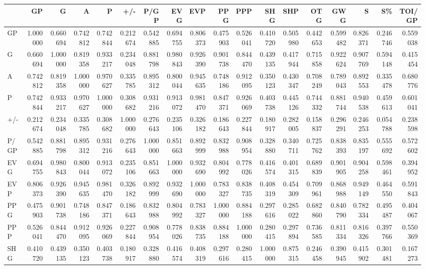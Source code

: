 \begin{tabular}{lrrrrrrrrrrrrrrrrr}
\toprule
 & GP & G & A & P & +/- & P/GP & EVG & EVP & PPG & PPP & SHG & SHP & OTG & GWG & S & S\% & TOI/GP \\
\midrule
GP & 1.000000 & 0.660694 & 0.742812 & 0.742844 & 0.212674 & 0.542885 & 0.694755 & 0.806373 & 0.475903 & 0.526041 & 0.410720 & 0.505980 & 0.442653 & 0.599482 & 0.826371 & 0.246746 & 0.559038 \\
G & 0.660694 & 1.000000 & 0.819358 & 0.933217 & 0.234048 & 0.881798 & 0.980843 & 0.926390 & 0.901738 & 0.844470 & 0.439135 & 0.417944 & 0.715858 & 0.922624 & 0.907769 & 0.594148 & 0.415454 \\
A & 0.742812 & 0.819358 & 1.000000 & 0.970627 & 0.335785 & 0.895312 & 0.800044 & 0.945635 & 0.748186 & 0.912095 & 0.350123 & 0.430347 & 0.708249 & 0.789043 & 0.892553 & 0.335478 & 0.680776 \\
P & 0.742844 & 0.933217 & 0.970627 & 1.000000 & 0.308682 & 0.931216 & 0.913072 & 0.981470 & 0.847371 & 0.926069 & 0.403738 & 0.445126 & 0.744332 & 0.881744 & 0.940538 & 0.459613 & 0.601041 \\
+/- & 0.212674 & 0.234048 & 0.335785 & 0.308682 & 1.000000 & 0.276643 & 0.235106 & 0.326182 & 0.186643 & 0.227844 & 0.180917 & 0.282005 & 0.158837 & 0.296291 & 0.246253 & 0.054788 & 0.238598 \\
P/GP & 0.542885 & 0.881798 & 0.895312 & 0.931216 & 0.276643 & 1.000000 & 0.851663 & 0.892999 & 0.832988 & 0.908954 & 0.328880 & 0.340711 & 0.725762 & 0.838393 & 0.835197 & 0.555692 & 0.572602 \\
EVG & 0.694755 & 0.980843 & 0.800044 & 0.913072 & 0.235106 & 0.851663 & 1.000000 & 0.932690 & 0.804992 & 0.778026 & 0.416574 & 0.401315 & 0.689839 & 0.901905 & 0.904258 & 0.598461 & 0.394952 \\
EVP & 0.806373 & 0.926390 & 0.945635 & 0.981470 & 0.326182 & 0.892999 & 0.932690 & 1.000000 & 0.783327 & 0.838735 & 0.408319 & 0.454309 & 0.709961 & 0.868988 & 0.949149 & 0.464550 & 0.591843 \\
PPG & 0.475903 & 0.901738 & 0.748186 & 0.847371 & 0.186643 & 0.832988 & 0.804992 & 0.783327 & 1.000000 & 0.884188 & 0.297616 & 0.285022 & 0.682860 & 0.840790 & 0.782334 & 0.495487 & 0.404067 \\
PPP & 0.526041 & 0.844470 & 0.912095 & 0.926069 & 0.227844 & 0.908954 & 0.778026 & 0.838735 & 0.884188 & 1.000000 & 0.280415 & 0.297894 & 0.736585 & 0.811334 & 0.816326 & 0.397766 & 0.550369 \\
SHG & 0.410720 & 0.439135 & 0.350123 & 0.403738 & 0.180917 & 0.328880 & 0.416574 & 0.408319 & 0.297616 & 0.280415 & 1.000000 & 0.875315 & 0.246458 & 0.390945 & 0.415902 & 0.301481 & 0.167273 \\

\end{tabular}
